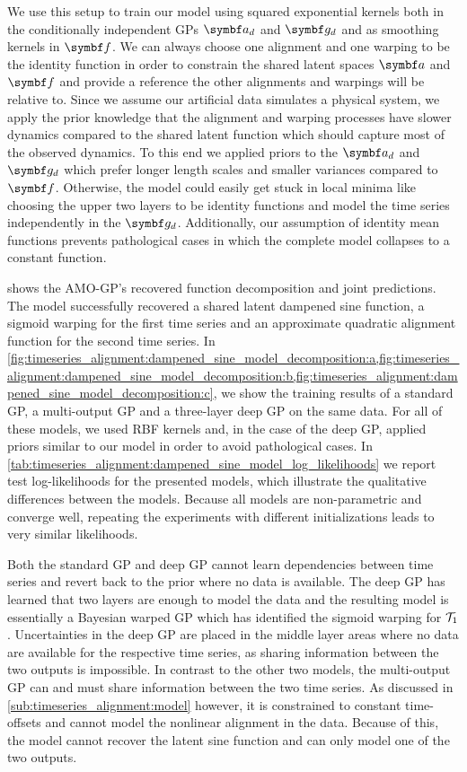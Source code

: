 We use this setup to train our model using squared exponential kernels both in the conditionally independent GPs $\rv{a_d}$ and $\rv{g_d}$ and as smoothing kernels in $\rv{f}$.
We can always choose one alignment and one warping to be the identity function in order to constrain the shared latent spaces $\rv{a}$ and $\rv{f}$ and provide a reference the other alignments and warpings will be relative to.
Since we assume our artificial data simulates a physical system, we apply the prior knowledge that the alignment and warping processes have slower dynamics compared to the shared latent function which should capture most of the observed dynamics.
To this end we applied priors to the $\rv{a_d}$ and $\rv{g_d}$ which prefer longer length scales and smaller variances compared to $\rv{f}$.
Otherwise, the model could easily get stuck in local minima like choosing the upper two layers to be identity functions and model the time series independently in the $\rv{g_d}$.
Additionally, our assumption of identity mean functions prevents pathological cases in which the complete model collapses to a constant function.

 shows the AMO-GP's recovered function decomposition and joint predictions.
The model successfully recovered a shared latent dampened sine function, a sigmoid warping for the first time series and an approximate quadratic alignment function for the second time series.
In \cref{fig:timeseries_alignment:dampened_sine_model_decomposition:a,fig:timeseries_alignment:dampened_sine_model_decomposition:b,fig:timeseries_alignment:dampened_sine_model_decomposition:c}, we show the training results of a standard GP, a multi-output GP and a three-layer deep GP on the same data.
For all of these models, we used RBF kernels and, in the case of the deep GP, applied priors similar to our model in order to avoid pathological cases.
In \cref{tab:timeseries_alignment:dampened_sine_model_log_likelihoods} we report test log-likelihoods for the presented models, which illustrate the qualitative differences between the models.
Because all models are non-parametric and converge well, repeating the experiments with different initializations leads to very similar likelihoods.

Both the standard GP and deep GP cannot learn dependencies between time series and revert back to the prior where no data is available.
The deep GP has learned that two layers are enough to model the data and the resulting model is essentially a Bayesian warped GP which has identified the sigmoid warping for $\mathcal{T}_1$.
Uncertainties in the deep GP are placed in the middle layer areas where no data are available for the respective time series, as sharing information between the two outputs is impossible.
In contrast to the other two models, the multi-output GP can and must share information between the two time series.
As discussed in \cref{sub:timeseries_alignment:model} however, it is constrained to constant time-offsets and cannot model the nonlinear alignment in the data.
Because of this, the model cannot recover the latent sine function and can only model one of the two outputs.


